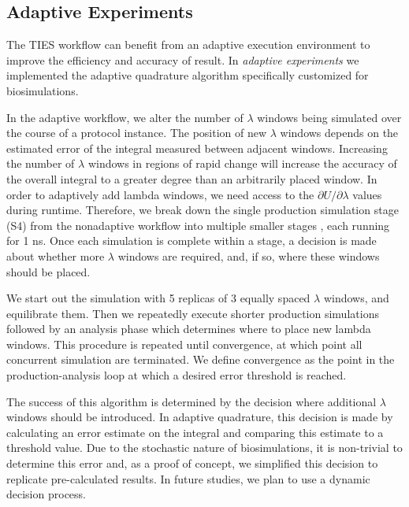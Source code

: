 \subsection{Adaptive Experiments}

The TIES workflow can benefit from an adaptive execution environment to
improve the efficiency and accuracy of result. In \emph{adaptive experiments}
we implemented the adaptive quadrature algorithm specifically customized for
biosimulations.

In the adaptive workflow, we alter the number of $\lambda$ windows being
simulated over the course of a protocol instance. The position of new
$\lambda$ windows depends on the estimated error of the integral measured
between adjacent windows. Increasing the number of $\lambda$ windows in
regions of rapid change will increase the accuracy of the overall integral to
a greater degree than an arbitrarily placed window. In order to adaptively
add lambda windows, we need access to the $\partial U/\partial\lambda$ values
during runtime. Therefore, we break down the single production simulation
stage (S4)  from the nonadaptive workflow into multiple smaller stages , each running for 1 ns. Once each simulation is complete within a
stage, a decision is made about whether more $\lambda$ windows are required,
and, if so, where these windows should be placed.

We start out the simulation with 5 replicas of 3  equally spaced $\lambda$ windows, and equilibrate 
them. Then we repeatedly execute shorter production simulations followed by an 
analysis phase which determines where to place new lambda windows. This 
procedure is repeated until convergence, at which point all concurrent 
simulation are terminated. We define convergence as the point in the 
production-analysis loop at which a desired error threshold is reached.

The success of this algorithm is determined by the decision where additional
$\lambda$ windows should be introduced. In adaptive quadrature, this decision
is made by calculating an error estimate on the integral and comparing this
estimate to a threshold value. Due to the stochastic nature of
biosimulations, it is non-trivial to determine this error and, as a proof of
concept, we simplified this decision to replicate pre-calculated results. In
future studies, we plan to use a dynamic decision process.

